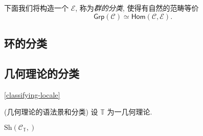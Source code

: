 下面我们将构造一个\topos{} $\mathcal E$, 称为\emph{群的分类\topos{}}, 使得有自然的范畴等价
$$
\mathsf {Grp}(\mathcal C) \simeq \mathsf{Hom}(\mathcal C,\mathcal E).
$$

\subsection{环的分类\topos{}}



%
%
%

\subsection{几何理论的分类\topos{}}

\ref{classifying-locale}

\begin{definition}
    {(几何理论的语法景和分类\topos{})}
    设 $\mathbb T$ 为一几何理论.
    
    $\text{Sh}(\mathcal C_{\mathbb T},)$
\end{definition}


